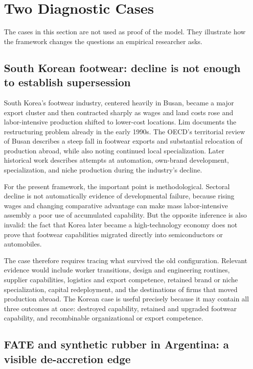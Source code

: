 \section{Two Diagnostic Cases}
\label{sec:cases}

The cases in this section are not used as proof of the model. They illustrate how the framework changes the questions an empirical researcher asks.

\subsection{South Korean footwear: decline is not enough to establish supersession}

South Korea's footwear industry, centered heavily in Busan, became a major export cluster and then contracted sharply as wages and land costs rose and labor-intensive production shifted to lower-cost locations. Lim documents the restructuring problem already in the early 1990s. The OECD's territorial review of Busan describes a steep fall in footwear exports and substantial relocation of production abroad, while also noting continued local specialization. Later historical work describes attempts at automation, own-brand development, specialization, and niche production during the industry's decline.

For the present framework, the important point is methodological. Sectoral decline is not automatically evidence of developmental failure, because rising wages and changing comparative advantage can make mass labor-intensive assembly a poor use of accumulated capability. But the opposite inference is also invalid: the fact that Korea later became a high-technology economy does not prove that footwear capabilities migrated directly into semiconductors or automobiles.

The case therefore requires tracing what survived the old configuration. Relevant evidence would include worker transitions, design and engineering routines, supplier capabilities, logistics and export competence, retained brand or niche specialization, capital redeployment, and the destinations of firms that moved production abroad. The Korean case is useful precisely because it may contain all three outcomes at once: destroyed capability, retained and upgraded footwear capability, and recombinable organizational or export competence.

\subsection{FATE and synthetic rubber in Argentina: a visible de-accretion edge}


